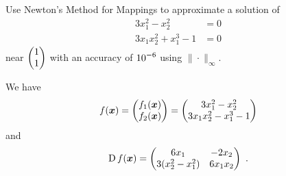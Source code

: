 \begin{egg}
Use Newton's Method for Mappings to approximate a solution of
\begin{align*}
3x_1^2 - x_2^2 &= 0\\
3x_1x_2^2 + x_1^3 - 1 &= 0
\end{align*}
near $\displaystyle \begin{pmatrix} 1 \\ 1 \end{pmatrix}$
with an accuracy of $\displaystyle 10^{-6}$ using $\|\cdot\|_\infty$.

We have
\[
f(\bm{x}) = \begin{pmatrix}
f_1(\bm{x}) \\ f_2(\bm{x})
\end{pmatrix} = \begin{pmatrix}
3x_1^2 - x_2^2 \\
3x_1x_2^2 - x_1^3 -1
\end{pmatrix}
\]
and
\[
\operatorname{D} f(\bm{x}) = \begin{pmatrix}
6x_1 &  -2 x_2 \\
3(x_2^2 - x_1^2) & 6x_1x_2
\end{pmatrix} \ .
\]


\end{egg}
